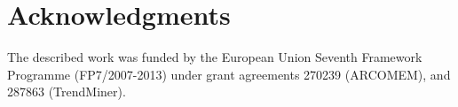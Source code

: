 \documentclass{../acm_proc_article-me11_tweaked}
\begin{document}
\section{Acknowledgments}
The described work was funded by the European Union Seventh Framework Programme (FP7/2007-2013) under grant agreements 270239 (ARCOMEM), and 287863 (TrendMiner).



\end{document}
